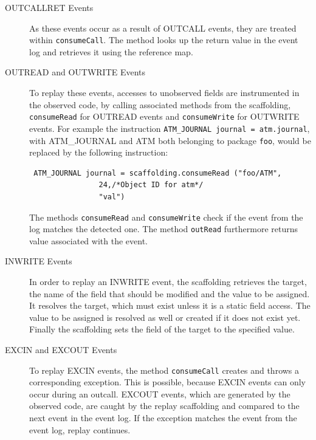 \begin{description}
 \item [OUTCALLRET Events]As these events occur as a result of OUTCALL events, they are treated within \texttt{consumeCall}. The method looks up the return value in the event log and retrieves it using the reference map. 
 \item [OUTREAD and OUTWRITE Events] To replay these events, accesses to unobserved fields are instrumented in the observed code, by calling associated methods from the scaffolding, \texttt{consumeRead} for OUTREAD events and \texttt{consumeWrite} for OUTWRITE events. For example the instruction \texttt{ATM\_JOURNAL journal = atm.journal}, with ATM\_JOURNAL and ATM both belonging to package \texttt{foo}, would be replaced by the following instruction:
\begin{lstlisting}
 ATM_JOURNAL journal = scaffolding.consumeRead ("foo/ATM",
                24,/*Object ID for atm*/
                "val")
\end{lstlisting}
The methods \texttt{consumeRead} and \texttt{consumeWrite} check if the event from the log matches the detected one. The method \texttt{outRead} furthermore returns value associated with the event.
 \item [INWRITE Events] In order to replay an INWRITE event, the scaffolding retrieves the target, the name of the field that should be modified and the value to be assigned. It resolves the target, which must exist unless it is a static field access. The value to be assigned is resolved as well or created if it does not exist yet. Finally the scaffolding sets the field of the target to the specified value.
 \item [EXCIN and EXCOUT Events]  To replay EXCIN events, the method \texttt{consumeCall} creates and throws a corresponding exception. This is possible, because EXCIN events can only occur during an outcall. EXCOUT events, which are generated by the observed code, are caught by the replay scaffolding and compared to the next event in the event log. If the exception matches the event from the event log, replay continues.
\end{description}


